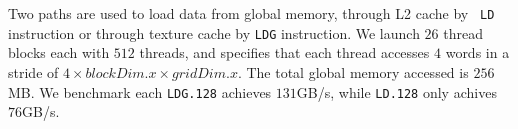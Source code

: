Two paths are used to load data from global memory, through L2 cache by {\tt
LD} instruction or through texture cache by {\tt LDG} instruction.
We launch $26$ thread blocks each with $512$ threads, and specifies that each thread accesses $4$ words in a stride of $4 \times blockDim.x \times gridDim.x$.
The total global memory accessed is $256$MB.
We benchmark each {\tt LDG.128} achieves $131$GB/s, while {\tt LD.128} only achives $76$GB/s.
